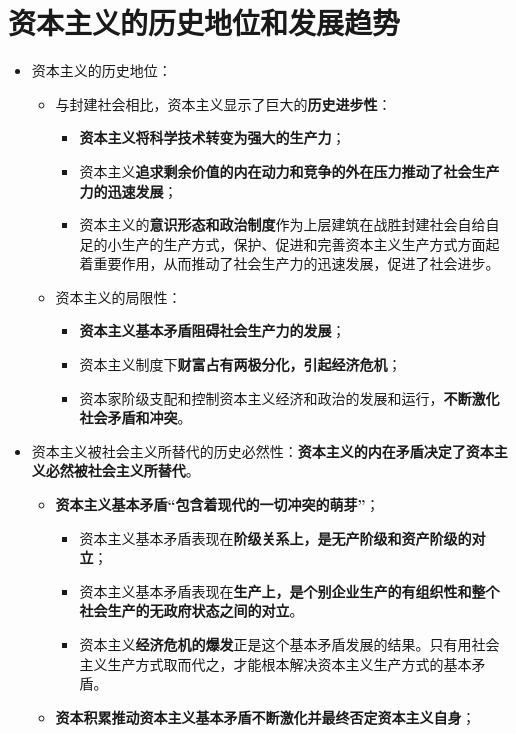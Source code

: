 \documentclass[12pt,openany]{ctexbook}
\begin{document}
\section{资本主义的历史地位和发展趋势}
\begin{itemize}
  \item 资本主义的历史地位：
\begin{itemize}
  \item 与封建社会相比，资本主义显示了巨大的\textbf{历史进步性}：
\begin{itemize}
  \item \textbf{资本主义将科学技术转变为强大的生产力}；
  \item 资本主义\textbf{追求剩余价值的内在动力和竞争的外在压力推动了社会生产力的迅速发展}；
  \item 资本主义的\textbf{意识形态和政治制度}作为上层建筑在战胜封建社会自给自足的小生产的生产方式，保护、促进和完善资本主义生产方式方面起着重要作用，从而推动了社会生产力的迅速发展，促进了社会进步。
\end{itemize}
  \item 资本主义的局限性：
\begin{itemize}
  \item \textbf{资本主义基本矛盾阻碍社会生产力的发展}；
  \item 资本主义制度下\textbf{财富占有两极分化，引起经济危机}；
  \item 资本家阶级支配和控制资本主义经济和政治的发展和运行，\textbf{不断激化社会矛盾和冲突}。
\end{itemize}
\end{itemize}
  \item 资本主义被社会主义所替代的历史必然性：\textbf{资本主义的内在矛盾决定了资本主义必然被社会主义所替代}。
\begin{itemize}
  \item \textbf{资本主义基本矛盾“包含着现代的一切冲突的萌芽”}；
\begin{itemize}
  \item 资本主义基本矛盾表现在\textbf{阶级关系上，是无产阶级和资产阶级的对立}；
  \item 资本主义基本矛盾表现在\textbf{生产上，是个别企业生产的有组织性和整个社会生产的无政府状态之间的对立}。
  \item 资本主义\textbf{经济危机的爆发}正是这个基本矛盾发展的结果。只有用社会主义生产方式取而代之，才能根本解决资本主义生产方式的基本矛盾。
\end{itemize}
  \item \textbf{资本积累推动资本主义基本矛盾不断激化并最终否定资本主义自身}；

\end{itemize}
\end{itemize}
\end{document}
